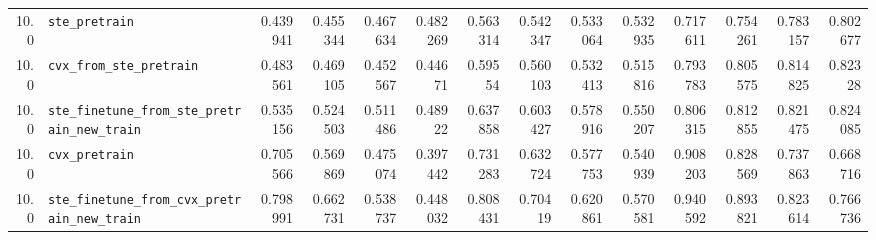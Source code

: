 \begin{longtable}{@{}r l *{12}{r}@{}}
10.0 & \texttt{ste\_pretrain} & 0.439941 & 0.455344 & 0.467634 & 0.482269 & 0.563314 & 0.542347 & 0.533064 & 0.532935 & 0.717611 & 0.754261 & 0.783157 & 0.802677 \\
10.0 & \texttt{cvx\_from\_ste\_pretrain} & 0.483561 & 0.469105 & 0.452567 & 0.44671 & 0.59554 & 0.560103 & 0.532413 & 0.515816 & 0.793783 & 0.805575 & 0.814825 & 0.82328 \\
10.0 & \texttt{ste\_finetune\_from\_ste\_pretrain\_new\_train} & 0.535156 & 0.524503 & 0.511486 & 0.48922 & 0.637858 & 0.603427 & 0.578916 & 0.550207 & 0.806315 & 0.812855 & 0.821475 & 0.824085 \\
10.0 & \texttt{cvx\_pretrain} & 0.705566 & 0.569869 & 0.475074 & 0.397442 & 0.731283 & 0.632724 & 0.577753 & 0.540939 & 0.908203 & 0.828569 & 0.737863 & 0.668716 \\
10.0 & \texttt{ste\_finetune\_from\_cvx\_pretrain\_new\_train} & 0.798991 & 0.662731 & 0.538737 & 0.448032 & 0.808431 & 0.70419 & 0.620861 & 0.570581 & 0.940592 & 0.893821 & 0.823614 & 0.766736 \\
\end{longtable}

